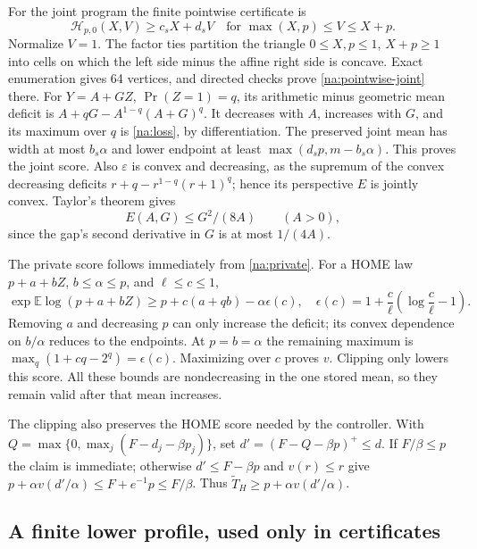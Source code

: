For the joint program the finite pointwise certificate is
\begin{equation}\label{na:pointwise-joint}
 \mathcal H_{p,0}(X,V)\ge c_sX+d_sV
 \quad\text{for }\max(X,p)\le V\le X+p.
\end{equation}
Normalize $V=1$. The factor ties partition the triangle
$0\le X,p\le1$, $X+p\ge1$ into cells on which the left side minus
the affine right side is concave. Exact enumeration gives 64 vertices,
and directed checks prove \eqref{na:pointwise-joint} there.
For $Y=A+GZ$, $\Pr(Z=1)=q$, its arithmetic minus geometric mean deficit
is $A+qG-A^{1-q}(A+G)^q$. It decreases with $A$, increases with $G$,
and its maximum over $q$ is \eqref{na:loss}, by differentiation.
The preserved joint mean has width at most $b_s\alpha$ and lower endpoint
at least $\max(d_sp,m-b_s\alpha)$. This proves the joint score.
Also $\varepsilon$ is convex and decreasing, as the supremum of the
convex decreasing deficits $r+q-r^{1-q}(r+1)^q$; hence its perspective
$E$ is jointly convex. Taylor's theorem gives
\begin{equation}\label{simp:loss-tail}
 E(A,G)\le G^2/(8A)\qquad(A>0),
\end{equation}
since the gap's second derivative in $G$ is at most $1/(4A)$.

The private score follows immediately from \eqref{na:private}.
For a HOME law $p+a+bZ$, $b\le\alpha\le p$, and $\ell\le c\le1$,
\[
 \exp\mathbb E\log(p+a+bZ)\ge p+c(a+qb)-\alpha\epsilon(c),\quad
 \epsilon(c)=1+\frac c\ell\left(\log\frac c\ell-1\right).
\]
Removing $a$ and decreasing $p$ can only increase the deficit; its
convex dependence on $b/\alpha$ reduces to the endpoints. At
$p=b=\alpha$ the remaining maximum is
$\max_q(1+cq-2^q)=\epsilon(c)$. Maximizing over $c$ proves $v$.
Clipping only lowers this score. All these bounds are nondecreasing
in the one stored mean, so they remain valid after that mean increases.

The clipping also preserves the HOME score needed by the controller.
With $Q=\max\{0,\max_j(F-d_j-\beta p_j)\}$, set
$d'=(F-Q-\beta p)^+\le d$. If $F/\beta\le p$ the claim is immediate;
otherwise $d'\le F-\beta p$ and $v(r)\le r$ give
$p+\alpha v(d'/\alpha)\le F+e^{-1}p\le F/\beta$.
Thus $\widetilde T_H\ge p+\alpha v(d'/\alpha)$.

\subsection{A finite lower profile, used only in certificates}

